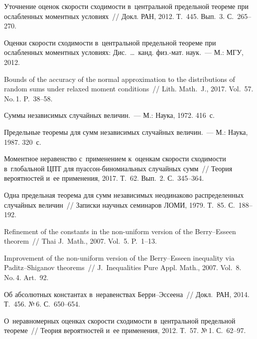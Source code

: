 \begin{multicols}{2}
{{\begin{thebibliography}{99}
 Уточнение оценок ско\-рости
сходимости в~центральной предельной тео\-ре\-ме при ослабленных
моментных условиях~// Докл. РАН, 2012. Т.~445. Вып.~3. С.~265--270.

 Оценки скорости сходимости в~центральной
предельной теореме при ослабленных моментных условиях: Дис.\ \ldots\ канд.
физ.-мат. наук.~--- М.: МГУ, 2012.

 Bounds of the accuracy of the normal
approximation to the distributions of random sums under relaxed
moment conditions~//  Lith. Math.~J., 2017. Vol.~57. No.\,1. P.~38--58.

 Суммы независимых случайных величин.~--- М.:
Наука, 1972. 416~с.

 Предельные теоремы для сумм независимых
случайных величин.~--- М.: Наука, 1987. 320~с.

 Моментное неравенство с~применением к~оценкам
скорости сходимости в~глобальной ЦПТ для пуас\-сон-би\-но\-ми\-аль\-ных
случайных сумм~// Тео\-рия вероятностей и~ее применения, 2017. Т.~62.
Вып.~2. С.~345--364.

 Одна предельная теорема для сумм независимых
неодинаково распределенных случайных величин~// Записки научных
семинаров ЛОМИ, 1979. Т.~85. С.~188--192.

 Refinement of the constants in the
non-uniform version of the Berry--Esseen theorem~// Thai J.~Math., 2007. Vol.~5. P.~1--13.

 Improvement of the non-uniform
version of the Berry--Esseen inequality via Paditz--Shiganov
theorems~// J.~Inequalities Pure  \mbox{Appl.} Math.,
2007. Vol.~8. No.\,4. Art.~92.

 Об абсолютных константах в~неравенствах
Бер\-ри--Эс\-се\-ена~//
Докл.\ РАН, 2014. Т.~456. №\,6. С.~650--654.

 О~неравномерных
оценках ско\-рости схо\-ди\-мости в~цент\-раль\-ной предельной
теореме~// Тео\-рия вероятностей и~ее применения, 2012. Т.~57. №\,1. С.~62--97.


\end{thebibliography}}}
\end{multicols}
